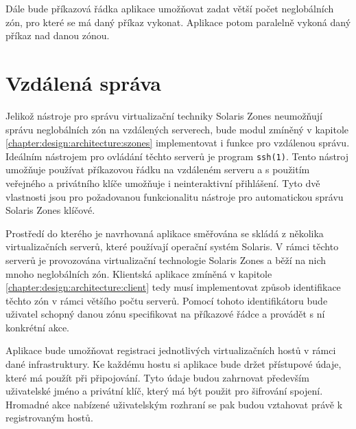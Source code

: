 Dále bude příkazová řádka aplikace umožňovat zadat větší počet neglobálních zón, pro které se má daný příkaz vykonat. Aplikace
potom paralelně vykoná daný příkaz nad danou zónou.
\section{Vzdálená správa}
\label{chapter:design:remote}
Jelikož nástroje pro správu virtualizační techniky Solaris Zones neumožňují správu neglobálních zón na vzdálených serverech,
bude modul zmíněný v kapitole \ref{chapter:design:architecture:szones} implementovat i funkce pro vzdálenou správu. Ideálním
nástrojem pro ovládání těchto serverů je program \verb|ssh(1)|. Tento nástroj umožňuje používat příkazovou řádku na 
vzdáleném serveru a s použitím veřejného a privátního klíče umožňuje i neinteraktivní přihlášení. Tyto dvě vlastnosti jsou
pro požadovanou funkcionalitu nástroje pro automatickou správu Solaris Zones klíčové.

Prostředí do kterého je navrhovaná aplikace směřována se skládá z několika virtualizačních serverů, které používají operační
systém Solaris. V rámci těchto serverů je provozována virtualizační technologie Solaris Zones a běží na nich mnoho neglobálních
zón. Klientská aplikace zmíněná v kapitole \ref{chapter:design:architecture:client} tedy musí implementovat způsob identifikace
těchto zón v rámci většího počtu serverů. Pomocí tohoto identifikátoru bude uživatel schopný danou zónu specifikovat na příkazové
řádce a provádět s ní konkrétní akce.

Aplikace bude umožňovat registraci jednotlivých virtualizačních hostů v rámci dané infrastruktury. Ke každému hostu si aplikace
bude držet přístupové údaje, které má použít při připojování. Tyto údaje budou zahrnovat především uživatelské jméno a 
privátní klíč, který má být použit pro šifrování spojení. Hromadné akce nabízené uživatelským rozhraní se pak budou vztahovat
právě k registrovaným hostů.
